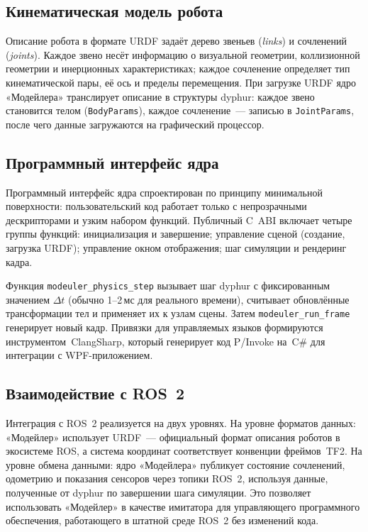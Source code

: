 \subsection{Кинематическая модель робота}

Описание робота в формате URDF задаёт дерево звеньев (\textit{links}) и сочленений (\textit{joints}). Каждое 
звено несёт информацию о визуальной геометрии, коллизионной геометрии и инерционных характеристиках; каждое 
сочленение определяет тип кинематической пары, её ось и пределы перемещения. При загрузке URDF ядро 
«Модейлера» транслирует описание в структуры dyphur: каждое звено становится телом (\texttt{BodyParams}), 
каждое сочленение~--- записью в \texttt{JointParams}, после чего данные загружаются на графический процессор.

\subsection{Программный интерфейс ядра}
\label{sec:core_api}

Программный интерфейс ядра спроектирован по принципу минимальной поверхности: пользовательский код работает 
только с непрозрачными дескрипторами и узким набором функций. Публичный C~ABI включает четыре группы функций: 
инициализация и завершение; управление сценой (создание, загрузка URDF); управление окном отображения; шаг 
симуляции и рендеринг кадра.

Функция \texttt{modeuler\_physics\_step} вызывает шаг dyphur с фиксированным значением $\Delta t$ (обычно 
1--2\,мс для реального времени), считывает обновлённые трансформации тел и применяет их к узлам сцены.
Затем \texttt{modeuler\_run\_frame} генерирует новый кадр. Привязки для управляемых языков формируются 
инструментом~ClangSharp, который генерирует код P/Invoke на~C\# для интеграции с WPF-приложением.

\subsection{Взаимодействие с ROS~2}

Интеграция с ROS~2 реализуется на двух уровнях. На уровне форматов данных: «Модейлер» использует URDF~--- 
официальный формат описания роботов в экосистеме ROS, а система координат соответствует конвенции фреймов~TF2. 
На уровне обмена данными: ядро «Модейлера» публикует состояние сочленений, одометрию и показания сенсоров 
через топики ROS~2, используя данные, полученные от dyphur по завершении шага симуляции. Это позволяет 
использовать «Модейлер» в качестве имитатора для управляющего программного обеспечения, работающего в штатной 
среде ROS~2 без изменений кода.
